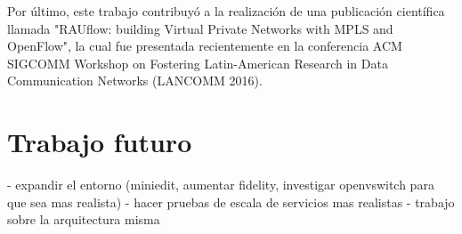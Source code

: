 Por último, este trabajo contribuyó a la realización de una publicación científica llamada "RAUflow: building Virtual Private Networks with MPLS and OpenFlow", la cual fue presentada recientemente en la conferencia ACM SIGCOMM Workshop on Fostering Latin-American Research in Data Communication Networks (LANCOMM 2016).


\section{Trabajo futuro}

- expandir el entorno (miniedit, aumentar fidelity, investigar openvswitch para que sea mas realista)
- hacer pruebas de escala de servicios mas realistas
- trabajo sobre la arquitectura misma
